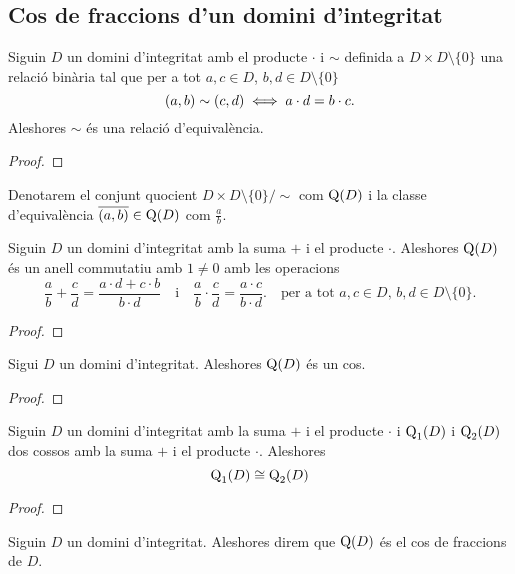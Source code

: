 \documentclass[../Apunts.tex]{subfiles}
\begin{document}
	\subsection{Cos de fraccions d'un domini d'integritat}
	\begin{proposition}
		\label{prop:relació d'equivalència cos de fraccions}
		Siguin \(D\) un domini d'integritat amb el producte \(\cdot\) i \(\sim\) definida a \(D\times D\setminus\{0\}\) una relació binària tal que per a tot \(a,c\in D\), \(b,d\in D\setminus\{0\}\) 
		\[(a,b)\sim(c,d)\iff a\cdot d=b\cdot c.\]
		Aleshores \(\sim\) és una relació d'equivalència.
		\begin{proof}
		\end{proof}
	\end{proposition}
	\begin{notation}
		Denotarem el conjunt quocient \(D\times D\setminus\{0\}/\sim\) com \(\operatorname{Q}(D)\) i la classe d'equivalència \(\overline{(a,b)}\in\operatorname{Q}(D)\) com \(\frac{a}{b}\).
	\end{notation}
	\begin{lemma}
		\label{lema:cos de fraccions}
		Siguin \(D\) un domini d'integritat amb la suma \(+\) i el producte \(\cdot\). Aleshores \(\operatorname{Q}(D)\) és un anell commutatiu amb \(1\neq0\) amb les operacions
		\[\frac{a}{b}+\frac{c}{d}=\frac{a\cdot d+c\cdot b}{b\cdot d}\quad\text{i}\quad\frac{a}{b}\cdot\frac{c}{d}=\frac{a\cdot c}{b\cdot d}.\quad\text{per a tot }a,c\in D\text{, }b,d\in D\setminus\{0\}.\]
		\begin{proof}
		\end{proof}
	\end{lemma}
	\begin{theorem}
		\label{thm:cos de fraccions}
		Sigui \(D\) un domini d'integritat. Aleshores \(\operatorname{Q}(D)\) és un cos.
		\begin{proof}
		\end{proof}
	\end{theorem}
	\begin{theorem}
		\label{tmh:unicitat del cos de fraccions d'un domini}
		Siguin \(D\) un domini d'integritat amb la suma \(+\) i el producte \(\cdot\) i \(\operatorname{Q}_{1}(D)\) i \(\operatorname{Q}_{2}(D)\) dos cossos  amb la suma \(+\) i el producte \(\cdot\). Aleshores
		\[\operatorname{Q}_{1}(D)\cong\operatorname{Q}_{2}(D)\]
		\begin{proof}
		\end{proof}
	\end{theorem}
	\begin{definition}
		\label{def:cos de fraccions}
		Siguin \(D\) un domini d'integritat. Aleshores direm que \(\operatorname{Q}(D)\) és el cos de fraccions de \(D\).
	\end{definition}
\end{document}
